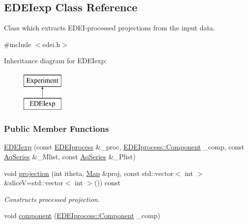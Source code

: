 \hypertarget{classEDEIexp}{
\subsection{EDEIexp Class Reference}
\label{classEDEIexp}
}


Class which extracts EDEI-\/processed projections from the input data.  




{\ttfamily \#include $<$edei.h$>$}

Inheritance diagram for EDEIexp:\begin{figure}[H]
\begin{center}
\leavevmode
\includegraphics[height=2.000000cm]{classEDEIexp}
\end{center}
\end{figure}
\subsubsection*{Public Member Functions}
\begin{DoxyCompactItemize}
\item 
\hyperlink{classEDEIexp_a3c3dcecfe5ca380884764c9bd5140b0a}{EDEIexp} (const \hyperlink{classEDEIprocess}{EDEIprocess} \&\_\-proc, \hyperlink{classEDEIprocess_a745d55d7f97f3aafa52998d49d9acde4}{EDEIprocess::Component} \_\-comp, const \hyperlink{classAqSeries}{AqSeries} \&\_\-Mlist, const \hyperlink{classAqSeries}{AqSeries} \&\_\-Plist)
\item 
void \hyperlink{classEDEIexp_acf7bbc96978ccbd57b5aad85eb4d4bd8}{projection} (int itheta, \hyperlink{group__Types_ga8747378c016fc11d9ecbb98787248c25}{Map} \&proj, const std::vector$<$ int $>$ \&sliceV=std::vector$<$ int $>$()) const 
\begin{DoxyCompactList}\small\item\em Constructs processed projection. \item\end{DoxyCompactList}\item 
void \hyperlink{classEDEIexp_a6afba833e82b79bb6f36ab9b37c36b0f}{component} (\hyperlink{classEDEIprocess_a745d55d7f97f3aafa52998d49d9acde4}{EDEIprocess::Component} \_\-comp)
\end{DoxyCompactItemize}
